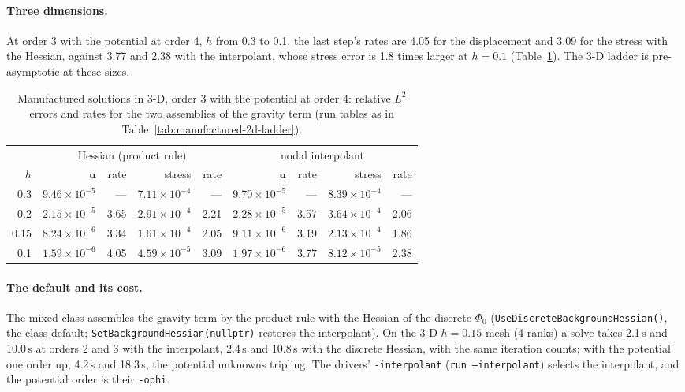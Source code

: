\documentclass[11pt]{article}
\numberwithin{equation}{section}
\newcommand{\vu}{\mathbf{u}}
\newcommand{\code}[1]{\texttt{#1}}
\begin{document}
\paragraph{Three dimensions.} At order 3 with the potential at order 4,
$h$ from 0.3 to 0.1, the last step's rates are 4.05 for the displacement
and 3.09 for the stress with the Hessian, against 3.77 and 2.38 with the
interpolant, whose stress error is 1.8 times larger at $h=0.1$
(Table~\ref{tab:manufactured-3d}). The 3-D ladder is pre-asymptotic at
these sizes.
\begin{table}[tp]
\centering
\small
\begin{tabular}{@{}r rrrr rrrr@{}}
\toprule
& \multicolumn{4}{c}{Hessian (product rule)} &
  \multicolumn{4}{c}{nodal interpolant} \\
\cmidrule(lr){2-5}\cmidrule(l){6-9}
$h$ & $\vu$ & rate & stress & rate & $\vu$ & rate & stress & rate \\
\midrule
0.3  & $9.46\times10^{-5}$ & ---  & $7.11\times10^{-4}$ & ---  & $9.70\times10^{-5}$ & ---  & $8.39\times10^{-4}$ & --- \\
0.2  & $2.15\times10^{-5}$ & 3.65 & $2.91\times10^{-4}$ & 2.21 & $2.28\times10^{-5}$ & 3.57 & $3.64\times10^{-4}$ & 2.06 \\
0.15 & $8.24\times10^{-6}$ & 3.34 & $1.61\times10^{-4}$ & 2.05 & $9.11\times10^{-6}$ & 3.19 & $2.13\times10^{-4}$ & 1.86 \\
0.1  & $1.59\times10^{-6}$ & 4.05 & $4.59\times10^{-5}$ & 3.09 & $1.97\times10^{-6}$ & 3.77 & $8.12\times10^{-5}$ & 2.38 \\
\bottomrule
\end{tabular}
\caption[Manufactured solutions in 3-D]{Manufactured solutions in 3-D, order 3 with the potential at order
4: relative $L^2$ errors and rates for the two assemblies of the gravity
term (run tables as in Table~\ref{tab:manufactured-2d-ladder}).}
\label{tab:manufactured-3d}
\end{table}

\paragraph{The default and its cost.} The mixed class assembles the
gravity term by the product rule with the Hessian of the discrete $\Phi_0$
(\code{UseDiscreteBackgroundHessian()}, the class default;
\code{SetBackgroundHessian(nullptr)} restores the interpolant). On the 3-D
$h=0.15$ mesh (4 ranks) a solve takes 2.1\,s and
10.0\,s at orders 2 and 3 with the interpolant, 2.4\,s and 10.8\,s with
the discrete Hessian, with the same iteration counts; with the potential
one order up, 4.2\,s and 18.3\,s, the potential unknowns tripling. The
drivers' \code{-interpolant} (\code{run --interpolant}) selects the
interpolant, and the potential order is their \code{-ophi}.
\end{document}
